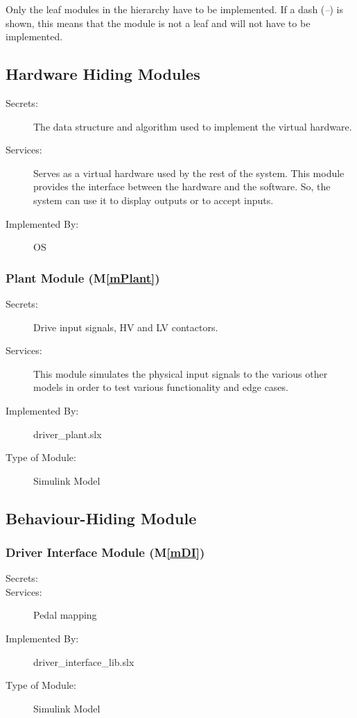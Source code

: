 \documentclass[12pt, titlepage]{article}
\newcommand{\mref}[1]{M\ref{#1}}
\begin{document}
Only the leaf modules in the hierarchy have to be implemented. If a dash
(\emph{--}) is shown, this means that the module is not a leaf and will not have
to be implemented.

\subsection{Hardware Hiding Modules}

\begin{description}
\item[Secrets:]The data structure and algorithm used to implement the virtual
  hardware.
\item[Services:]Serves as a virtual hardware used by the rest of the
  system. This module provides the interface between the hardware and the
  software. So, the system can use it to display outputs or to accept inputs.
\item[Implemented By:] OS
\end{description}

\subsubsection{Plant Module (\mref{mPlant})}
\begin{description}
\item[Secrets:]Drive input signals, HV and LV contactors.
\item[Services:]This module simulates the physical input signals to the various other models in order to test various functionality and edge cases.
\item[Implemented By:] driver\_plant.slx
\item[Type of Module:] Simulink Model
\end{description}

\subsection{Behaviour-Hiding Module}

\subsubsection{Driver Interface Module (\mref{mDI})}
\begin{description}
\item[Secrets:]
\item[Services:]Pedal mapping
\item[Implemented By:] driver\_interface\_lib.slx
\item[Type of Module:] Simulink Model
\end{description}
\end{document}
